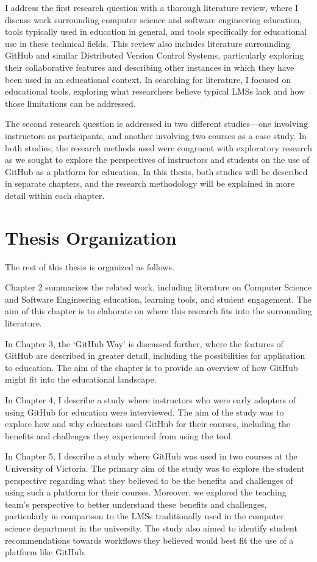 I address the first research question with a thorough literature review, where I discuss work surrounding computer science and software engineering education, tools typically used in education in general, and tools specifically for educational use in these technical fields. This review also includes literature surrounding GitHub and similar Distributed Version Control Systems, particularly exploring their collaborative features and describing other instances in which they have been used in an educational context. In searching for literature, I focused on educational tools, exploring what researchers believe typical LMSs lack and how those limitations can be addressed.

The second research question is addressed in two different studies---one involving instructors as participants, and another involving two courses as a case study. In both studies, the research methods used were congruent with exploratory research as we sought to explore the perspectives of instructors and students on the use of GitHub as a platform for education. In this thesis, both studies will be described in separate chapters, and the research methodology will be explained in more detail within each chapter.

\section{Thesis Organization}
The rest of this thesis is organized as follows.

Chapter 2 summarizes the related work, including literature on Computer Science and Software Engineering education, learning tools, and student engagement. The aim of this chapter is to elaborate on where this research fits into the surrounding literature.

In Chapter 3, the `GitHub Way' is discussed further, where the features of GitHub are described in greater detail, including the possibilities for application to education. The aim of the chapter is to provide an overview of how GitHub might fit into the educational landscape.

In Chapter 4, I describe a study where instructors who were early adopters of using GitHub for education were interviewed. The aim of the study was to explore how and why educators used GitHub for their courses, including the benefits and challenges they experienced from using the tool.

In Chapter 5, I describe a study where GitHub was used in two courses at the University of Victoria. The primary aim of the study was to explore the student perspective regarding what they believed to be the benefits and challenges of using such a platform for their courses. Moreover, we explored the teaching team's perspective to better understand these benefits and challenges, particularly in comparison to the LMSs traditionally used in the computer science department in the university. The study also aimed to identify student recommendations towards workflows they believed would best fit the use of a platform like GitHub.

